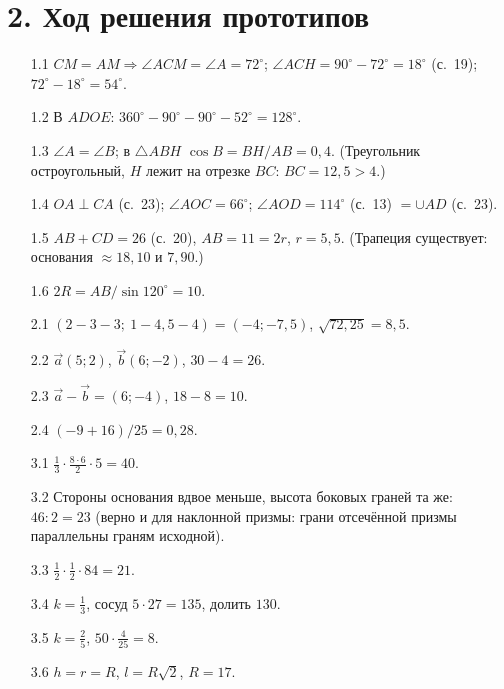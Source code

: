 \documentclass[fontsize=10pt]{scrartcl}
\begin{document}
\section*{2. Ход решения прототипов}
\begin{enumerate}[label=\textbf{\arabic*.},leftmargin=7mm]
\item[1.1] $CM=AM\Rightarrow\angle ACM=\angle A=72^\circ$; $\angle ACH=90^\circ-72^\circ=18^\circ$ (с.~19); $72^\circ-18^\circ=54^\circ$.
\item[1.2] В $ADOE$: $360^\circ-90^\circ-90^\circ-52^\circ=128^\circ$.
\item[1.3] $\angle A=\angle B$; в $\triangle ABH$ $\cos B=BH/AB=0{,}4$. (Треугольник остроугольный, $H$ лежит на отрезке $BC$: $BC=12{,}5>4$.)
\item[1.4] $OA\perp CA$ (с.~23); $\angle AOC=66^\circ$; $\angle AOD=114^\circ$ (с.~13) $=\cup AD$ (с.~23).
\item[1.5] $AB+CD=26$ (с.~20), $AB=11=2r$, $r=5{,}5$. (Трапеция существует: основания $\approx18{,}10$ и $7{,}90$.)
\item[1.6] $2R=AB/\sin120^\circ=10$.
\item[2.1] $(2-3-3;\ 1-4{,}5-4)=(-4;-7{,}5)$, $\sqrt{72{,}25}=8{,}5$.
\item[2.2] $\vec a(5;2)$, $\vec b(6;-2)$, $30-4=26$.
\item[2.3] $\vec a-\vec b=(6;-4)$, $18-8=10$.
\item[2.4] $(-9+16)/25=0{,}28$.
\item[3.1] $\tfrac13\cdot\tfrac{8\cdot6}{2}\cdot5=40$.
\item[3.2] Стороны основания вдвое меньше, высота боковых граней та же: $46:2=23$ (верно и для наклонной призмы: грани отсечённой призмы параллельны граням исходной).
\item[3.3] $\tfrac12\cdot\tfrac12\cdot84=21$.
\item[3.4] $k=\tfrac13$, сосуд $5\cdot27=135$, долить $130$.
\item[3.5] $k=\tfrac25$, $50\cdot\tfrac4{25}=8$.
\item[3.6] $h=r=R$, $l=R\sqrt2$, $R=17$.
\end{enumerate}
\end{document}
